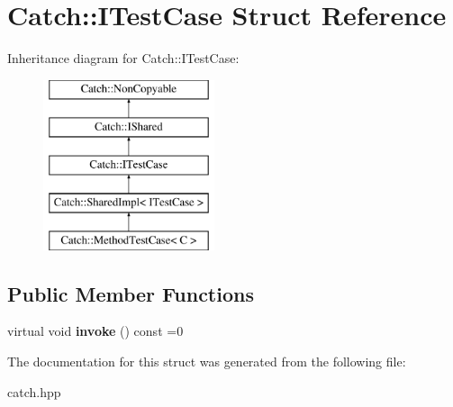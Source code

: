 \hypertarget{structCatch_1_1ITestCase}{}\section{Catch\+:\+:I\+Test\+Case Struct Reference}
\label{structCatch_1_1ITestCase}
Inheritance diagram for Catch\+:\+:I\+Test\+Case\+:\begin{figure}[H]
\begin{center}
\leavevmode
\includegraphics[height=5.000000cm]{structCatch_1_1ITestCase}
\end{center}
\end{figure}
\subsection*{Public Member Functions}
\begin{DoxyCompactItemize}
\item 
\mbox{\label{structCatch_1_1ITestCase_a678825e62e7c17297621cfeb65588c34}} 
virtual void {\bfseries invoke} () const =0
\end{DoxyCompactItemize}


The documentation for this struct was generated from the following file\+:\begin{DoxyCompactItemize}
\item 
catch.\+hpp\end{DoxyCompactItemize}
